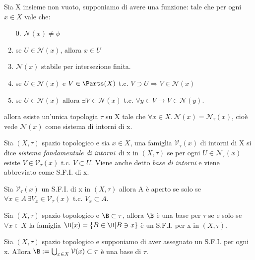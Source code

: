 \documentclass[a4paper]{article}
\begin{document}
\begin{prop}
Sia X insieme non vuoto, supponiamo di avere una funzione: 
tale che per ogni $ x \in X$ vale che:
\begin{enumerate}
	\item[0.] $ \mathcal{N} (x) \neq \phi $
	\item se $U \in \mathcal{N} (x) $, allora $x \in U$
	\item $\mathcal{N}  (x) $ stabile per intersezione finita.
 	\item se $U \in \mathcal{N}  (x)$ e $ V \in \Parts (X) $ t.c. $V \supset U \Rightarrow V \in \mathcal{N}  (x)$
	\item se $ U \in \mathcal{N} (x) $ allora $\exists V \in \mathcal{N}  (x) $ t.c. $\forall y \in V \to V \in \mathcal{N} (y) $.
\end{enumerate}
allora esiste un'unica topologia $\tau $ su X tale che $\forall x \in X . \,  \mathcal{N} (x) = \mathcal{N} _{\tau } (x) $, cioè vede $\mathcal{N} (x) $ come sistema di intorni di x.
\end{prop}

\begin{deff}
Sia $(X,\tau ) $ spazio topologico e sia $x \in X $, una famiglia $\mathcal{V} _{\tau } (x) $ di intorni di X si dice \emph{sistema fondamentale di intorni} di x in $(X,\tau )$ se per ogni $U \in \mathcal{N} _{\tau } (x)$ esiste $ V \in \mathcal{V} _{\tau } (x)$ t.c. $V \subset U $. Viene anche detto \emph{base di intorni} e viene abbreviato come S.F.I. di x.
\end{deff}

\begin{prop}
Sia $\mathcal{V} _{\tau } (x) $ un S.F.I. di x in $(X,\tau )$ allora A è aperto se solo se $\forall x \in A\, \exists V_x \in \mathcal{V} _{\tau } (x) $ t.c. $ V_x \subset A $.
\end{prop}

\begin{prop}
Sia $(X, \tau ) $ spazio topologico e $\B \subset \tau $, allora $\B $ è una base per $\tau $ se e solo se $\forall x \in X$ la famiglia $\B (x) = \{ B \in \B | B \ni x \} $ è un S.F.I. per x in $(X,\tau )$.
\end{prop}

\begin{cor}
Sia $(X, \tau ) $ spazio topologico e supponiamo di aver assegnato un S.F.I. per ogni x. Allora $ \B := \bigcup _{x \in X} \mathcal{V} (x) \subset \tau $ è una base di $\tau $. 
\end{cor}
\end{document}
